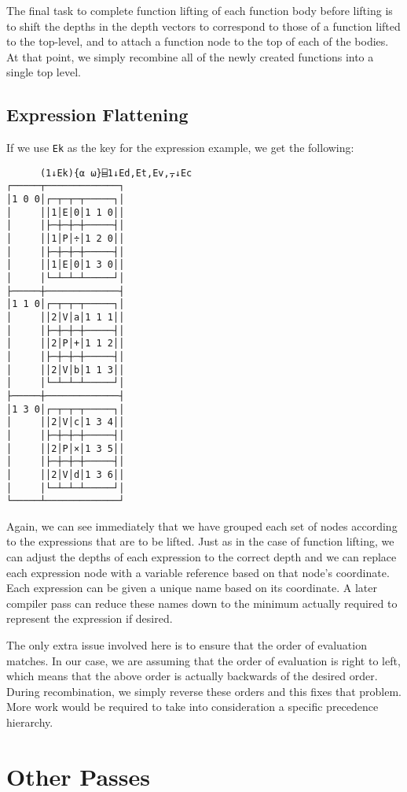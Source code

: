 \documentclass[numbers,preprint]{sigplanconf}
\begin{document}
The final task to complete function lifting of each function
body before lifting is to shift the depths in the depth vectors
to correspond to those of a function lifted to the top-level, and
to attach a function node to the top of each of the bodies. At that
point, we simply recombine all of the newly created functions into
a single top level.

\subsection{Expression Flattening}

If we use \verb;Ek; as the key for the expression example, we get the
following:

\begin{verbatim}
      (1↓Ek){⍺ ⍵}⌸1↓Ed,Et,Ev,⍪↓Ec
┌─────┬─────────────┐
│1 0 0│┌─┬─┬─┬─────┐│
│     ││1│E│0│1 1 0││
│     │├─┼─┼─┼─────┤│
│     ││1│P│÷│1 2 0││
│     │├─┼─┼─┼─────┤│
│     ││1│E│0│1 3 0││
│     │└─┴─┴─┴─────┘│
├─────┼─────────────┤
│1 1 0│┌─┬─┬─┬─────┐│
│     ││2│V│a│1 1 1││
│     │├─┼─┼─┼─────┤│
│     ││2│P│+│1 1 2││
│     │├─┼─┼─┼─────┤│
│     ││2│V│b│1 1 3││
│     │└─┴─┴─┴─────┘│
├─────┼─────────────┤
│1 3 0│┌─┬─┬─┬─────┐│
│     ││2│V│c│1 3 4││
│     │├─┼─┼─┼─────┤│
│     ││2│P│×│1 3 5││
│     │├─┼─┼─┼─────┤│
│     ││2│V│d│1 3 6││
│     │└─┴─┴─┴─────┘│
└─────┴─────────────┘
\end{verbatim}

Again, we can see immediately that we have grouped each set of nodes
according to the expressions that are to be lifted. Just as in the
case of function lifting, we can adjust the depths of each expression
to the correct depth and we can replace each expression node with a
variable reference based on that node’s coordinate. Each expression
can be given a unique name based on its coordinate. A later compiler
pass can reduce these names down to the minimum actually required to
represent the expression if desired.

The only extra issue involved here is to ensure that the order of
evaluation matches. In our case, we are assuming that the order of
evaluation is right to left, which means that the above order is
actually backwards of the desired order. During recombination, we
simply reverse these orders and this fixes that problem. More work
would be required to take into consideration a specific precedence
hierarchy.

\section{Other Passes}
\end{document}
